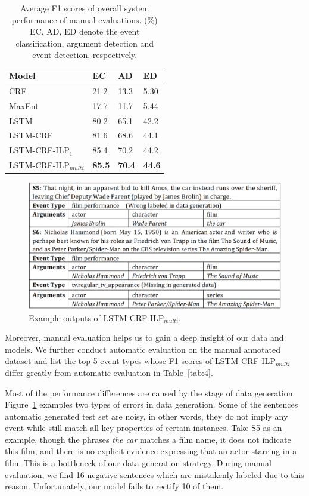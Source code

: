 \documentclass{article}
\begin{document}
\begin{table}[h]
\small
\centering
\begin{tabular}{|l|p{0.8cm}<{\centering}|p{0.8cm}<{\centering}|p{0.8cm}<{\centering}|} \hline
	Model & EC & AD & ED \\ \hline
	CRF & 21.2 & 13.3 & 5.30 \\ \hline
	MaxEnt & 17.7 & 11.7 & 5.44 \\ \hline
	LSTM & 80.2 & 65.1 & 42.2 \\ \hline \hline
	LSTM-CRF & 81.6 & 68.6 & 44.1 \\ \hline
	LSTM-CRF-ILP$_{1}$ & 85.4 & 70.2 & 44.2 \\ \hline
	LSTM-CRF-ILP$_{multi}$ & \textbf{85.5} & \textbf{70.4} & \textbf{44.6} \\ \hline
\end{tabular}
\caption{Average F1 scores of overall system performance of manual evaluations. (\%) EC, AD, ED denote the event classification, argument detection and event detection, respectively. \label{tab:2}}
\end{table}

\begin{figure}[h]
	\centering
	\includegraphics[width=.48\textwidth]{example.png}
	\caption{Example outputs of LSTM-CRF-ILP$_{multi}$.\label{fig:1}}
\end{figure}

Moreover, manual evaluation helps us to gain a deep insight of our data and models. We further conduct automatic evaluation on the manual annotated dataset and list the top 5 event types whose F1 scores of LSTM-CRF-ILP$_{multi}$ differ greatly from automatic evaluation in Table~\ref{tab:4}. 

Most of the performance differences are caused by the stage of data generation. Figure~\ref{fig:1} examples two types of errors in data generation. Some of the sentences automatic generated test set are noisy, in other words, they do not imply any event while still match all key properties of certain instances. Take S5 as an example, though the phrases \emph{the car} matches a film name, it does not indicate this film, and there is no explicit evidence expressing that an actor starring in a film. This is a bottleneck of our data generation strategy. During manual evaluation, we find 16 negative sentences which are mistakenly labeled due to this reason. Unfortunately, our model fails to rectify 10 of them.
\end{document}

